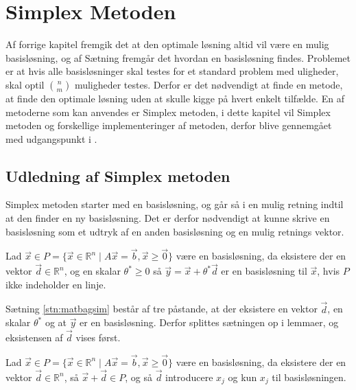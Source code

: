 \chapter{Simplex Metoden}
Af forrige kapitel fremgik det at den optimale løsning altid vil være en mulig basisløsning, og af Sætning 
fremgår det hvordan en basisløsning findes. 
Problemet er at hvis alle basisløsninger skal testes for et standard problem med uligheder, skal optil $\binom{n}{m}$ muligheder testes. 
Derfor er det nødvendigt at finde en metode, at finde den optimale løsning uden at skulle kigge på hvert enkelt tilfælde. 
En af metoderne som kan anvendes er Simplex metoden, i dette kapitel vil Simplex metoden og forskellige implementeringer af metoden, derfor blive gennemgået med udgangspunkt i .
\section{Udledning af Simplex metoden}
Simplex metoden starter med en basisløsning, og går så i en mulig retning indtil at den finder en ny basisløsning.
Det er derfor nødvendigt at kunne skrive en basisløsning som et udtryk af en anden basisløsning og en mulig retnings vektor.
\begin{stn}
Lad $\vec{x} \in P =\{\vec{x}\in \mathds{R}^n \mid A\vec{x}= \vec{b}, \vec{x}\geq \vec{0}\}$ være en basisløsning, da eksistere der en vektor $\vec{d}\in \mathds{R}^n$, og en skalar $\theta^*\geq 0$ så $\vec{y}= \vec{x} + \theta^* \vec{d}$ er en basisløsning til $\vec{x}$, hvis $P$ ikke indeholder en linje.
\label{stn:matbagsim}
\end{stn}
Sætning \ref{stn:matbagsim} består af tre påstande, at der eksistere en vektor $\vec{d}$, en skalar $\theta^*$ og at $\vec{y}$ er en basisløsning.
Derfor splittes sætningen op i lemmaer, og eksistensen af $\vec{d}$ vises først.
\begin{lma}
Lad $\vec{x} \in P =\{\vec{x}\in \mathds{R}^n \mid A\vec{x}= \vec{b}, \vec{x}\geq \vec{0}\}$ være en basisløsning, da eksistere der en vektor $\vec{d}\in \mathds{R}^n$, så $\vec{x} + \vec{d} \in P$, og så $\vec{d}$ introducere $x_j$ og kun $x_j$ til basisløsningen.
\label{lma:retningsvektor}
\end{lma}
